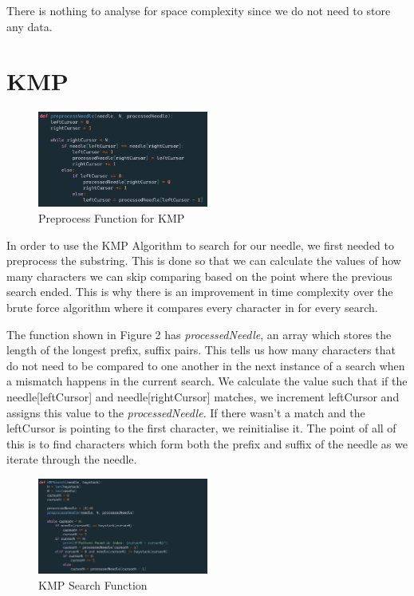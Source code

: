There is nothing to analyse for space complexity since we do not need to store any data.

\section*{KMP}

\begin{figure}[h]
    \centering
    \includegraphics[width=0.50\textwidth]{images/preprocessKMP.png}
    \caption{Preprocess Function for KMP}
\end{figure}

In order to use the KMP Algorithm to search for our needle, we first needed to preprocess the substring. This is done so that we can calculate the values of how many characters we can skip comparing based on the point where the previous search ended. This is why there is an improvement in time complexity over the brute force algorithm where it compares every character in for every search. 

The function shown in Figure 2 has \emph{processedNeedle}, an array which stores the length of the longest prefix, suffix pairs. This tells us how many characters that do not need to be compared to one another in the next instance of a search when a mismatch happens in the current search. We calculate the value such that if the needle[leftCursor] and needle[rightCursor] matches, we increment leftCursor and assigns this value to the \emph{processedNeedle}. If there wasn't a match and the leftCursor is pointing to the first character, we reinitialise it. The point of all of this is to find characters which form both the prefix and suffix of the needle as we iterate through the needle.

\begin{figure}[h!]
    \centering
    \includegraphics[width=0.50\textwidth]{images/KMP.png}
    \caption{KMP Search Function}
\end{figure}


